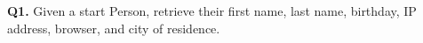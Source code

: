 \textbf{Q1.}
Given a start Person, retrieve their first name, last name, birthday, IP
address, browser, and city of residence.
